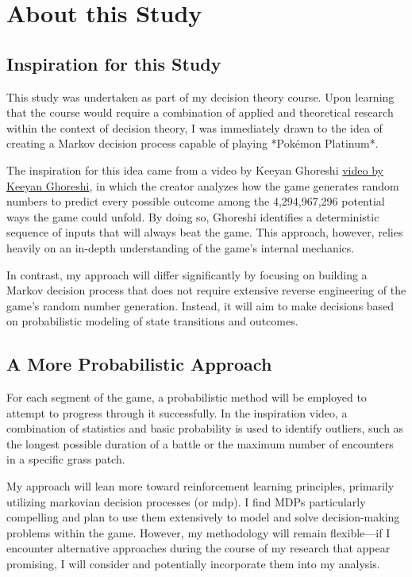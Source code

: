 \chapter{About this Study}

\section{Inspiration for this Study}

This study was undertaken as part of my decision theory course. Upon learning that the course would require a combination of applied and theoretical research within the context of decision theory, I was immediately drawn to the idea of creating a Markov decision process capable of playing *Pokémon Platinum*.

The inspiration for this idea came from a video by Keeyan Ghoreshi \href{https://www.youtube.com/watch?v=jNMWkD5VsZ8}{video by Keeyan Ghoreshi}, in which the creator analyzes how the game generates random numbers to predict every possible outcome among the 4,294,967,296 potential ways the game could unfold. By doing so, Ghoreshi identifies a deterministic sequence of inputs that will always beat the game. This approach, however, relies heavily on an in-depth understanding of the game's internal mechanics.

In contrast, my approach will differ significantly by focusing on building a Markov decision process that does not require extensive reverse engineering of the game’s random number generation. Instead, it will aim to make decisions based on probabilistic modeling of state transitions and outcomes.

\section{A More Probabilistic Approach}

For each segment of the game, a probabilistic method will be employed to attempt to progress through it successfully. In the inspiration video, a combination of statistics and basic probability is used to identify outliers, such as the longest possible duration of a battle or the maximum number of encounters in a specific grass patch.

My approach will lean more toward reinforcement learning principles, primarily utilizing \gls{markovian decision processes} (or \gls{mdp}). I find MDPs particularly compelling and plan to use them extensively to model and solve decision-making problems within the game. However, my methodology will remain flexible—if I encounter alternative approaches during the course of my research that appear promising, I will consider and potentially incorporate them into my analysis.

